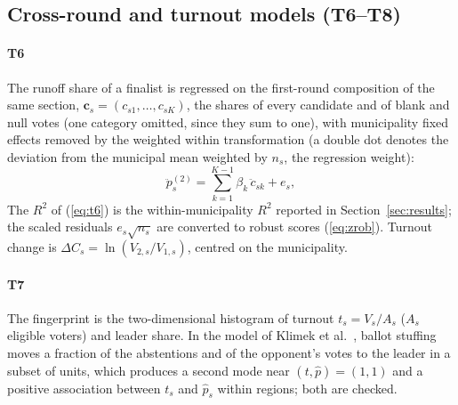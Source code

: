 \subsection{Cross-round and turnout models (T6--T8)}

\paragraph{T6} The runoff share of a finalist is regressed on the
first-round composition of the same section, $\mathbf c_s=(c_{s1},\dots,c_{sK})$,
the shares of every candidate and of blank and null votes (one category
omitted, since they sum to one), with municipality fixed effects removed by
the weighted within transformation (a double dot denotes the deviation from
the municipal mean weighted by $n_s$, the regression weight):
\begin{equation}
\ddot p^{(2)}_s=\sum_{k=1}^{K-1}\beta_k\,\ddot c_{sk}+e_s,
\label{eq:t6}
\end{equation}
The $R^2$ of (\ref{eq:t6}) is the
within-municipality $R^2$ reported in Section~\ref{sec:results}; the scaled residuals
$e_s\sqrt{n_s}$ are converted to robust scores (\ref{eq:zrob}). Turnout
change is $\Delta C_s=\ln(V_{2,s}/V_{1,s})$, centred on the municipality.

\paragraph{T7} The fingerprint is the two-dimensional histogram of turnout
$t_s=V_s/A_s$ ($A_s$ eligible voters) and leader share. In the model of
Klimek et al.\ \cite{klimek2012}, ballot stuffing moves a fraction of the
abstentions and of the opponent's votes to the leader in a subset of units,
which produces a second mode near $(t,\hat p)=(1,1)$ and a positive
association between $t_s$ and $\hat p_s$ within regions; both are checked.

